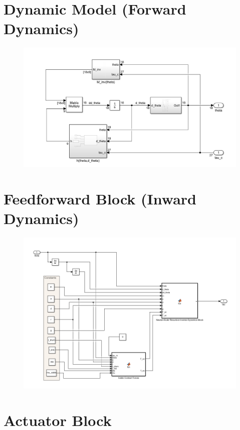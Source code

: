 \documentclass[a4paper,12pt]{report}
\begin{document}
\begin{appendices}
	\section{Dynamic Model (Forward Dynamics)}
	\begin{figure}[H]
		\includegraphics[width=\textwidth]{images/Dynamic-Model_BD.png}
	\end{figure}

	\section{Feedforward Block (Inward Dynamics)}
	\label{appendix d:4}
	\begin{figure}[H]
		\includegraphics[width=\textwidth]{images/Feedforward-block-in-model.png}
	\end{figure}
	
	\section{Actuator Block}

\end{appendices}
\end{document}
